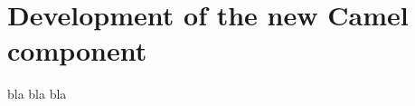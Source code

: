 \documentclass[12pt,final,oneside]{fithesis2}
\begin{document}
\section{Development of the new Camel component}\label{component-devel}
bla bla bla
%
\end{document}
